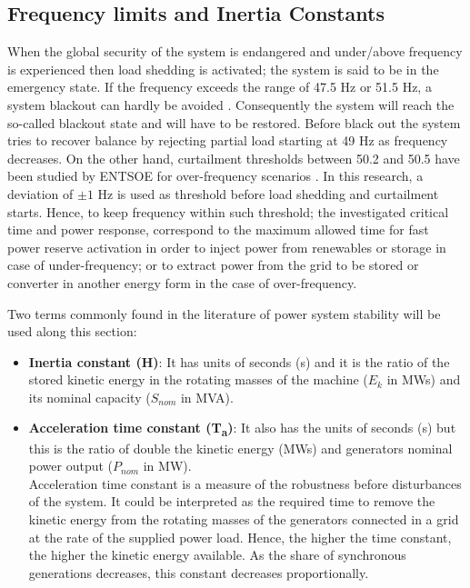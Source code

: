 \subsection{Frequency limits and Inertia Constants}
When the global security of the system is endangered and under/above frequency is experienced then load shedding is activated; the system is said to be in the emergency state. If the frequency exceeds the range of 47.5 Hz or 51.5 Hz, a system blackout can hardly be avoided \cite{ENTSOE.2016}. Consequently the system will reach the so-called blackout state and will have to be restored. Before black out the system tries to recover balance by rejecting partial load starting at 49 Hz as frequency decreases. On the other hand, curtailment thresholds between 50.2 and 50.5 have been studied by ENTSOE for over-frequency scenarios \cite{ENTSOE.2016}. In this research, a deviation of $ \pm1 $ Hz is used as threshold before load shedding and curtailment starts. Hence, to keep frequency within such threshold; the investigated critical time and power response, correspond to the maximum allowed time for fast power reserve activation in order to inject power from renewables or storage in case of under-frequency; or to extract power from the grid to be stored or converter in another energy form in the case of over-frequency.

Two terms commonly found in the literature of power system stability will be used along this section:

\begin{itemize}[leftmargin=*,labelsep=5.8mm]
	\item \textbf{Inertia constant (H)}: It has units of seconds (s) and it is the ratio of the stored kinetic energy in the rotating masses of the machine ($E_k$ in MWs) and its nominal capacity ($S_{nom}$ in MVA).\\
	\item \textbf{Acceleration time constant (T\textsubscript{a})}: It also has the units of seconds (s) but this is the ratio of double the kinetic energy (MWs) and generators nominal power output ($P_{nom}$ in MW).\\
	 Acceleration time constant is a measure of the robustness before disturbances of the system. It could be interpreted as the required time to remove the kinetic energy from the rotating masses of the generators connected in a grid at the rate of the supplied power load. Hence, the higher the time constant, the higher the kinetic energy available. As the share of synchronous generations decreases, this constant decreases proportionally.
\end{itemize}

